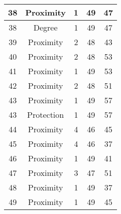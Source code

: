 \documentclass[results.tex]{subfiles}
\begin{document}
\begin{center}
\begin{tabular}{| c || c | c | c | c |}
            \hline
            38                      & Proximity                    & 1                      & 49                      & 47                   \\
            \hline
            38                      & Degree                       & 1                      & 49                      & 47                   \\
            \hline
            39                      & Proximity                    & 2                      & 48                      & 43                   \\
            \hline
            40                      & Proximity                    & 2                      & 48                      & 53                   \\
            \hline
            41                      & Proximity                    & 1                      & 49                      & 53                   \\
            \hline
            42                      & Proximity                    & 2                      & 48                      & 51                   \\
            \hline
            43                      & Proximity                    & 1                      & 49                      & 57                   \\
            \hline
            43                      & Protection                   & 1                      & 49                      & 57                   \\
            \hline
            44                      & Proximity                    & 4                      & 46                      & 45                   \\
            \hline
            45                      & Proximity                    & 4                      & 46                      & 37                   \\
            \hline
            46                      & Proximity                    & 1                      & 49                      & 41                   \\
            \hline
            47                      & Proximity                    & 3                      & 47                      & 51                   \\
            \hline
            48                      & Proximity                    & 1                      & 49                      & 37                   \\
            \hline
            49                      & Proximity                    & 1                      & 49                      & 45                   \\
            \hline
        \end{tabular}
    \end{center}
\end{document}
